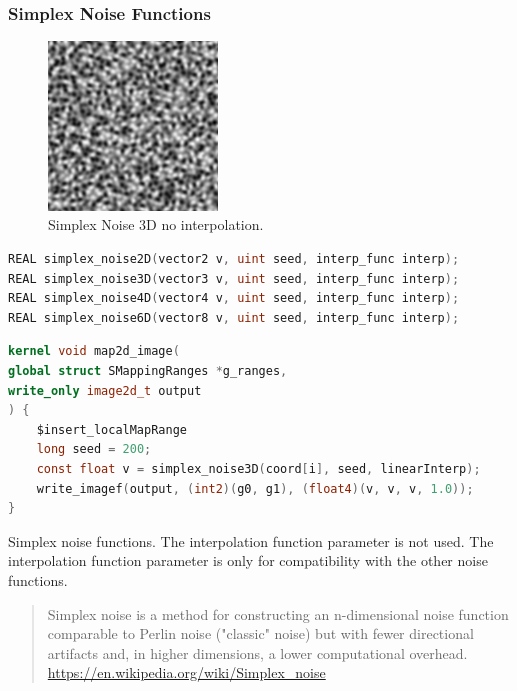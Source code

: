 \subsubsection{Simplex Noise Functions}

\begin{figure}[h]
\centering
\includegraphics[width=0.4\textwidth]{out/noise_functions/simplex_noise3D_noInterp.png}
\caption{Simplex Noise 3D no interpolation.}
\label{fig:simplex_noise3D_noInterp}
\end{figure}

\begin{lstlisting}[caption={Definition of simplex noise functions},label={lst:simplex_noise_definition},language=OpenCL]
REAL simplex_noise2D(vector2 v, uint seed, interp_func interp);
REAL simplex_noise3D(vector3 v, uint seed, interp_func interp);
REAL simplex_noise4D(vector4 v, uint seed, interp_func interp);
REAL simplex_noise6D(vector8 v, uint seed, interp_func interp);
\end{lstlisting}

\begin{lstlisting}[caption={Example for simplex noise functions},label={lst:simplex_noise_example},language=OpenCL]
kernel void map2d_image(
global struct SMappingRanges *g_ranges,
write_only image2d_t output
) {
    $insert_localMapRange
    long seed = 200;
    const float v = simplex_noise3D(coord[i], seed, linearInterp);
    write_imagef(output, (int2)(g0, g1), (float4)(v, v, v, 1.0));
}
\end{lstlisting}

Simplex noise functions. The interpolation function parameter is not used.
The interpolation function parameter is only for compatibility with
the other noise functions.

\begin{quote}
Simplex noise is a method for constructing an n-dimensional noise function
comparable to Perlin noise ("classic" noise) but with fewer directional
artifacts and, in higher dimensions, a lower computational overhead.
\url{https://en.wikipedia.org/wiki/Simplex_noise}
\end{quote}

